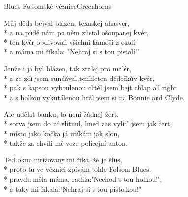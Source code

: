 \documentclass[10.5pt]{book}
\begin{document}
\begin{poem}{Blues Folsomské věznice}{Greenhorns}

\settowidth{\versewidth}{pravdu měla máma, radila:"Nechoď s tou holkou!",}

Můj děda bejval blázen, texaskej ahasver,\\*
a na půdě nám po něm zůstal ošoupanej kvér,\\*
ten kvér obdivovali všichni kámoši z okolí\\*
a máma mi říkala: "Nehraj si s tou pistolí!"

Jenže i já byl blázen, tak zralej pro malér,\\*
a ze zdi jsem sundával tenhleten dědečkův kvér,\\*
pak s kapsou vyboulenou chtěl jsem bejt chlap all right\\*
a s holkou vykutálenou hrál jsem si na Bonnie and Clyde.

Ale udělat banku, to není žádnej žert,\\*
sotva jsem do ní vlítnul, hned zas vylít' jsem jak čert,\\*
místo jako kočka já utíkám jak slon,\\*
takže za chvíli mě veze policejní anton.

Teď okno mřížovaný mi říká, že je šlus,\\*
proto tu ve věznici zpívám tohle Folsom Blues.\\*
pravdu měla máma, radila:"Nechoď s tou holkou!",\\*
a taky mi říkala:"Nehraj si s tou pistolkou!" 

\end{poem}
\end{document}
